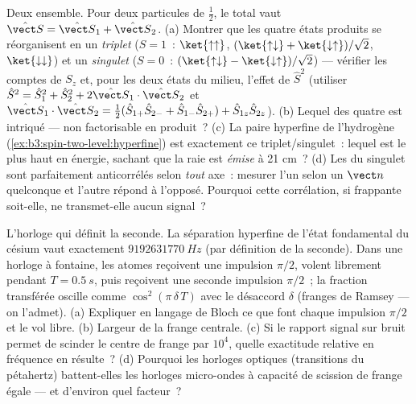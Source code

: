 \begin{exercise}[$\star\star\star$]\label{exo:b3:spin-two-level:11}
Deux  ensemble. Pour deux particules de  $\tfrac12$, le 
total vaut $\hat{\vect S} = \hat{\vect S}_1 + \hat{\vect S}_2$. (a)
Montrer que les quatre états produits se réorganisent en un
\emph{triplet} ($S = 1$~:
$\ket{\uparrow\uparrow}$, $(\ket{\uparrow\downarrow} +
\ket{\downarrow\uparrow})/\sqrt2$, $\ket{\downarrow\downarrow}$)
et un \emph{singulet} ($S = 0$~: $(\ket{\uparrow\downarrow} -
\ket{\downarrow\uparrow})/\sqrt2$) --- vérifier les comptes de $S_z$
et, pour les deux états du milieu, l'effet de $\hat S^2$ (utiliser $\hat
S^2 = \hat S_1^2 + \hat S_2^2 + 2\hat{\vect S}_1\cdot\hat{\vect
S}_2$ et $\hat{\vect S}_1\cdot\hat{\vect S}_2 = \tfrac12(\hat
S_{1+}\hat S_{2-} + \hat S_{1-}\hat S_{2+}) + \hat S_{1z}\hat
S_{2z}$). (b) Lequel des quatre est intriqué --- non factorisable en
produit~? (c) La paire hyperfine de l'hydrogène
(\cref{ex:b3:spin-two-level:hyperfine}) est exactement ce
triplet/singulet~: lequel est le plus haut en énergie, sachant que la
raie est \emph{émise} à 21 cm~? (d) Les  du singulet sont
parfaitement anticorrélés selon \emph{tout} axe~: mesurer l'un selon
un $\vect n$ quelconque et l'autre répond à l'opposé. Pourquoi cette
corrélation, si frappante soit-elle, ne transmet-elle aucun signal~?
\end{exercise}

\begin{exercise}[$\star\star\star$]\label{exo:b3:spin-two-level:12}
L'horloge qui définit la seconde. La séparation hyperfine de l'état
fondamental du césium vaut exactement $\qty{9192631770}{Hz}$ (par
définition de la seconde). Dans une horloge à fontaine, les atomes
reçoivent une impulsion $\pi/2$, volent librement pendant
$T = \qty{0.5}{s}$, puis reçoivent une seconde impulsion $\pi/2$~; la
fraction transférée oscille comme $\cos^2(\pi\,\delta\,T)$ avec le
désaccord $\delta$ (franges de Ramsey --- on l'admet). (a) Expliquer
en langage de Bloch ce que font chaque impulsion $\pi/2$ et le vol
libre. (b) Largeur de la frange centrale. (c) Si le rapport signal sur
bruit permet de scinder le centre de frange par $10^4$, quelle
exactitude relative en fréquence en résulte~? (d) Pourquoi les
horloges optiques (transitions du pétahertz) battent-elles les
horloges micro-ondes à capacité de scission de frange égale --- et
d'environ quel facteur~?
\end{exercise}

